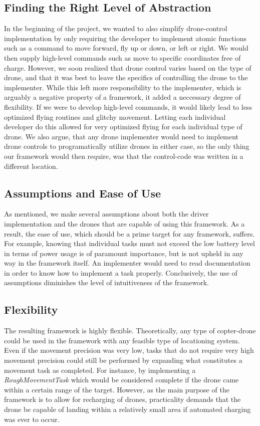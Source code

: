 \subsection{Finding the Right Level of Abstraction}
In the beginning of the project, we wanted to also simplify drone-control implementation by only requiring the developer to implement atomic functions such as a command to move forward, fly up or down, or left or right. We would then supply high-level commands such as move to specific coordinates free of charge. However, we soon realized that drone control varies based on the type of drone, and that it was best to leave the specifics of controlling the drone to the implementer. While this left more responsibility to the implementer, which is arguably a negative property of a framework, it added a neccessary degree of flexibility. If we were to develop high-level commands, it would likely lead to less optimized flying routines and glitchy movement. Letting each individual developer do this allowed for very optimized flying for each individual type of drone. We also argue, that any drone implementer would need to implement drone controls to programatically utilize drones in either case, so the only thing our framework would then require, was that the control-code was written in a different location.

\subsection{Assumptions and Ease of Use}
As mentioned, we make several assumptions about both the driver implementation and the drones that are capable of using this framework. As a result, the ease of use, which should be a prime target for any framework, suffers. For example, knowing that individual tasks must not exceed the low battery level in terms of power usage is of paramount importance, but is not upheld in any way in the framework itself. An implementer would need to read documentation in order to know how to implement a task properly. Conclusively, the use of assumptions diminishes the level of intuitiveness of the framework.

\subsection{Flexibility}
The resulting framework is highly flexible. Theoretically, any type of copter-drone could be used in the framework with any feasible type of locationing system. Even if the movement precision was very low, tasks that do not require very high movement precision could still be performed by expanding what constitutes a movement task as completed. For instance, by implementing a \textit{RoughMovementTask} which would be considered complete if the drone came within a certain range of the target. However, as the main purpose of the framework is to allow for recharging of drones, practicality demands that the drone be capable of landing within a relatively small area if automated charging was ever to occur.

